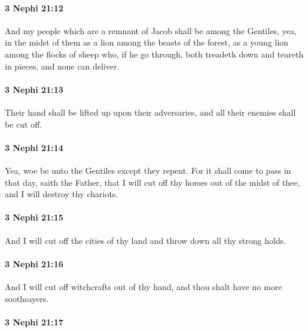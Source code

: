 		\paragraph{3 Nephi 21:12} %
			\label{3NEPHI-21-12}

			And my people which are a remnant of Jacob shall be among the Gentiles,
			yea, in the midst of them as a lion among the beasts of the forest,
			as a young lion among the flocks of sheep
			who, if he go through, both treadeth down and teareth in pieces,
			and none can deliver.

		\paragraph{3 Nephi 21:13} %
			\label{3NEPHI-21-13}

			Their hand shall be lifted up upon their adversaries,
			and all their enemies shall be cut off.

		\paragraph{3 Nephi 21:14} %
			\label{3NEPHI-21-14}

			Yea, woe be unto the Gentiles except they repent.
			For it shall come to pass in that day, saith the Father,
			that I will cut off thy horses out of the midst of thee,
			and I will destroy thy chariots.

		\paragraph{3 Nephi 21:15} %
			\label{3NEPHI-21-15}

			And I will cut off the cities of thy land
			and throw down all thy strong holds.

		\paragraph{3 Nephi 21:16} %
			\label{3NEPHI-21-16}

			And I will cut off witchcrafts out of thy hand,
			and thou shalt have no more soothsayers.

		\paragraph{3 Nephi 21:17} %
			\label{3NEPHI-21-17}

